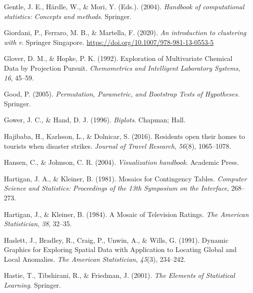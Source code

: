 \documentclass[
  letterpaper,
]{book}
\newlength{\cslhangindent}
\newlength{\cslentryspacingunit} %
\newenvironment{CSLReferences}[2] %
 {%
  \setlength{\parindent}{0pt}
  \ifodd #1
  \let\oldpar\par
  \def\par{\hangindent=\cslhangindent\oldpar}
  \fi
  \setlength{\parskip}{#2\cslentryspacingunit}
 }%
 {}
\begin{document}
\begin{CSLReferences}{1}{0}
\leavevmode{}%
Gentle, J. E., Härdle, W., \& Mori, Y. (Eds.). (2004). \emph{Handbook of
computational statistics: Concepts and methods}. Springer.

\leavevmode{}%
Giordani, P., Ferraro, M. B., \& Martella, F. (2020). \emph{An
introduction to clustering with r}. Springer Singapore.
\url{https://doi.org/10.1007/978-981-13-0553-5}

\leavevmode{}%
Glover, D. M., \& Hopke, P. K. (1992). {E}xploration of {M}ultivariate
{C}hemical {D}ata by {P}rojection {P}ursuit. \emph{Chemometrics and
Intelligent Laboratory Systems}, \emph{16}, 45--59.

\leavevmode{}%
Good, P. (2005). \emph{Permutation, {P}arametric, and {B}ootstrap
{T}ests of {H}ypotheses}. Springer.

\leavevmode{}%
Gower, J. C., \& Hand, D. J. (1996). \emph{Biplots}. Chapman; Hall.

\leavevmode{}%
Hajibaba, H., Karlsson, L., \& Dolnicar, S. (2016). Residents open their
homes to tourists when disaster strikes. \emph{Journal of Travel
Research}, \emph{56}(8), 1065--1078.

\leavevmode{}%
Hansen, C., \& Johnson, C. R. (2004). \emph{Visualization handbook}.
Academic Press.

\leavevmode{}%
Hartigan, J. A., \& Kleiner, B. (1981). Mosaics for {C}ontingency
{T}ables. \emph{Computer Science and Statistics: Proceedings of the 13th
Symposium on the Interface}, 268--273.

\leavevmode{}%
Hartigan, J., \& Kleiner, B. (1984). A {M}osaic of {T}elevision
{R}atings. \emph{The American Statistician}, \emph{38}, 32--35.

\leavevmode{}%
Haslett, J., Bradley, R., Craig, P., Unwin, A., \& Wills, G. (1991).
{D}ynamic {G}raphics for {E}xploring {S}patial {D}ata with {A}pplication
to {L}ocating {G}lobal and {L}ocal {A}nomalies. \emph{The American
Statistician}, \emph{45}(3), 234--242.

\leavevmode{}%
Hastie, T., Tibshirani, R., \& Friedman, J. (2001). \emph{The {E}lements
of {S}tatistical {L}earning}. Springer.


\end{CSLReferences}
\end{document}
